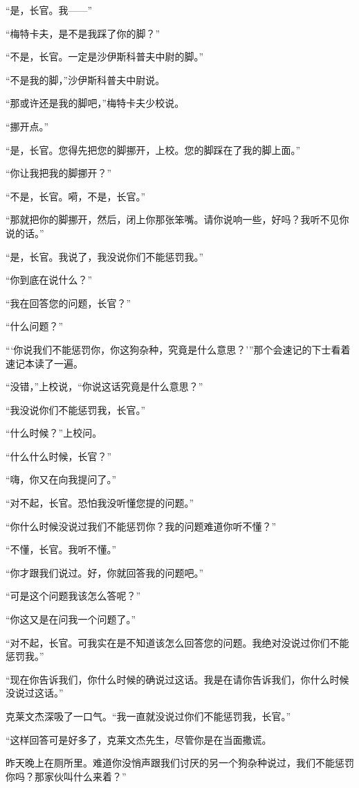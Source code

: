     “是，长官。我——”

    “梅特卡夫，是不是我踩了你的脚？”

    “不是，长官。一定是沙伊斯科普夫中尉的脚。”

    “不是我的脚，”沙伊斯科普夫中尉说。

    “那或许还是我的脚吧，”梅特卡夫少校说。

    “挪开点。”

    “是，长官。您得先把您的脚挪开，上校。您的脚踩在了我的脚上面。”

    “你让我把我的脚挪开？”

    “不是，长官。嗬，不是，长官。”

    “那就把你的脚挪开，然后，闭上你那张笨嘴。请你说响一些，好吗？我听不见你说的话。”

    “是，长官。我说了，我没说你们不能惩罚我。”

    “你到底在说什么？”

    “我在回答您的问题，长官？”

    “什么问题？”

    “‘你说我们不能惩罚你，你这狗杂种，究竟是什么意思？’”那个会速记的下士看着速记本读了一遍。

    “没错，”上校说，“你说这话究竟是什么意思？”

    “我没说你们不能惩罚我，长官。”

    “什么时候？”上校问。

    “什么什么时候，长官？”

    “嗨，你又在向我提问了。”

    “对不起，长官。恐怕我没听懂您提的问题。”

    “你什么时候没说过我们不能惩罚你？我的问题难道你听不懂？”

    “不懂，长官。我听不懂。”

    “你才跟我们说过。好，你就回答我的问题吧。”

    “可是这个问题我该怎么答呢？”

    “你这又是在问我一个问题了。”

    “对不起，长官。可我实在是不知道该怎么回答您的问题。我绝对没说过你们不能惩罚我。”

    “现在你告诉我们，你什么时候的确说过这话。我是在请你告诉我们，你什么时候没说过这话。”

    克莱文杰深吸了一口气。“我一直就没说过你们不能惩罚我，长官。”

    “这样回答可是好多了，克莱文杰先生，尽管你是在当面撒谎。

    昨天晚上在厕所里。难道你没悄声跟我们讨厌的另一个狗杂种说过，我们不能惩罚你吗？那家伙叫什么来着？”

